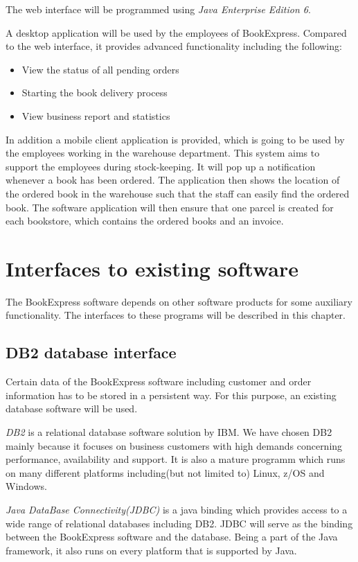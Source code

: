 The web interface will be programmed using \emph{Java Enterprise Edition 6}.

A desktop application will be used by the employees of BookExpress. Compared to the web interface, it provides advanced functionality including the following:
\begin{itemize}
\item View the status of all pending orders
\item Starting the book delivery process
\item View business report and statistics
\end{itemize}

In addition a mobile client application is provided, which is going to be used by the employees working in the warehouse department. This system aims to support the employees during stock-keeping. It will pop up a notification whenever a book has been ordered. The application then shows the location of the ordered book in the warehouse such that the staff can easily find the ordered book. The software application will then ensure that one parcel is created for each bookstore, which contains the ordered books and an invoice.

\chapter{Interfaces to existing software}
The BookExpress software depends on other software products for some auxiliary functionality. The interfaces to these programs will be described in this chapter.
\section{DB2 database interface}
Certain data of the BookExpress software including customer and order information has to be stored in a persistent way. For this purpose, an existing database software will be used.

\emph{DB2} is a relational database software solution by IBM. We have chosen DB2 mainly because it focuses on business customers with high demands concerning performance, availability and support. It is also a mature programm which runs on many different platforms including(but not limited to) Linux, z/OS and Windows.

\emph{Java DataBase Connectivity(JDBC)} is a java binding which provides access to a wide range of relational databases including DB2. JDBC will serve as the binding between the BookExpress software and the database. Being a part of the Java framework, it also runs on every platform that is supported by Java.

